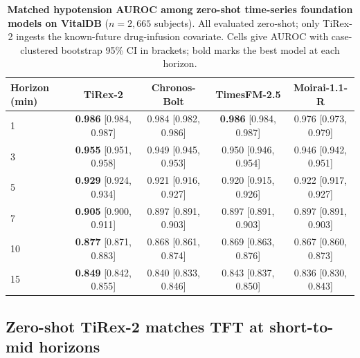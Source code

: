 \documentclass[11pt]{article}
\begin{document}
\begin{table}[ht]
\centering\footnotesize
\caption{\textbf{Matched hypotension AUROC among zero-shot time-series foundation models on VitalDB} ($n=2{,}665$ subjects). All evaluated zero-shot; only TiRex-2 ingests the known-future drug-infusion covariate. Cells give AUROC with case-clustered bootstrap 95\% CI in brackets; bold marks the best model at each horizon.}
\label{tab:zeroshot}
\begin{tabular}{lcccc}
\toprule
Horizon (min) & TiRex-2 & Chronos-Bolt & TimesFM-2.5 & Moirai-1.1-R \\
\midrule
1  & \textbf{0.986} [0.984, 0.987] & 0.984 [0.982, 0.986] & \textbf{0.986} [0.984, 0.987] & 0.976 [0.973, 0.979] \\
3  & \textbf{0.955} [0.951, 0.958] & 0.949 [0.945, 0.953] & 0.950 [0.946, 0.954] & 0.946 [0.942, 0.951] \\
5  & \textbf{0.929} [0.924, 0.934] & 0.921 [0.916, 0.927] & 0.920 [0.915, 0.926] & 0.922 [0.917, 0.927] \\
7  & \textbf{0.905} [0.900, 0.911] & 0.897 [0.891, 0.903] & 0.897 [0.891, 0.903] & 0.897 [0.891, 0.903] \\
10 & \textbf{0.877} [0.871, 0.883] & 0.868 [0.861, 0.874] & 0.869 [0.863, 0.876] & 0.867 [0.860, 0.873] \\
15 & \textbf{0.849} [0.842, 0.855] & 0.840 [0.833, 0.846] & 0.843 [0.837, 0.850] & 0.836 [0.830, 0.843] \\
\bottomrule
\end{tabular}
\end{table}

\subsection{Zero-shot TiRex-2 matches TFT at short-to-mid horizons}
\end{document}
